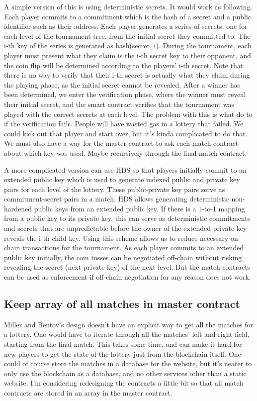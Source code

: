 A simple version of this is using deterministic secrets. It would work as following. Each player commits to a commitment which is the hash of a secret and a public identifier such as their address. Each player generates a series of secrets, one for each level of the tournament tree, from the initial secret they committed to. The i-th key of the series is generated as hash(secret, i). During the tournament, each player must present what they claim is the i-th secret key to their opponent, and the coin flip will be determined according to the players' i-th secret. Note that there is no way to verify that their i-th secret is actually what they claim during the playing phase, as the initial secret cannot be revealed. After a winner has been determined, we enter the verification phase, where the winner must reveal their initial secret, and the smart contract verifies that the tournament was played with the correct secrets at each level. 
The problem with this is what do to if the verification fails. People will have wasted gas in a lottery that failed. We could kick out that player and start over, but it's kinda complicated to do that. We must also have a way for the master contract to ask each match contract about which key was used. Maybe recursively through the final match contract.

A more complicated version can use HDS so that players initially commit to an extended public key which is used to generate indexed public and private key pairs for each level of the lottery. These public-private key pairs serve as commitment-secret pairs in a match. HDS allows generating deterministic non-hardened public keys from an extended public key. If there is a 1-to-1 mapping from a public key to its private key, this can serve as deterministic commitments and secrets that are unpredictable before the owner of the extended private key reveals the i-th child key. Using this scheme allows us to reduce necessary on-chain transactions for the tournament. As each player commits to an extended public key initially, the coin tosses can be negotiated off-chain without risking revealing the secret (next private key) of the next level. But the match contracts can be used as enforcement if off-chain negotiation for any reason does not work. 

\subsection{Keep array of all matches in master contract}
Miller and Bentov's design doesn't have an explicit way to get all the matches for a lottery. One would have to iterate through all the matches' left and right field, starting from the final match. This takes some time, and can make it hard for new players to get the state of the lottery just from the blockchain itself. One could of course store the matches in a database for the website, but it's neater to only use the blockchain as a database, and no other services other than a static website. I'm considering redesigning the contracts a little bit so that all match contracts are stored in an array in the master contract.

